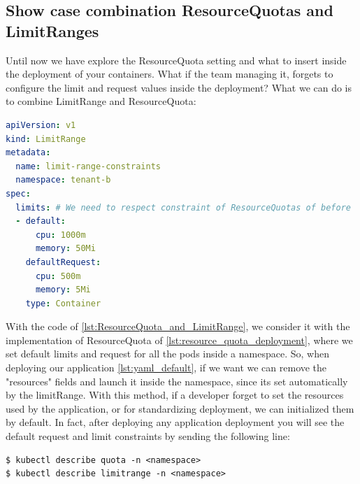 \subsection{Show case combination ResourceQuotas and LimitRanges}
Until now we have explore the ResourceQuota setting and what to insert inside the deployment of your containers. What if the team managing it, forgets to configure the limit and request values inside the deployment? What we can do is to combine LimitRange and ResourceQuota:
\begin{lstlisting}[language=yaml, caption={LimitRange setup with ResourceQuota}, label={lst:ResourceQuota_and_LimitRange}]
apiVersion: v1
kind: LimitRange
metadata:
  name: limit-range-constraints
  namespace: tenant-b
spec:
  limits: # We need to respect constraint of ResourceQuotas of before
  - default: 
      cpu: 1000m
      memory: 50Mi
    defaultRequest: 
      cpu: 500m
      memory: 5Mi
    type: Container
\end{lstlisting}
With the code of \autoref{lst:ResourceQuota_and_LimitRange}, we consider it with the implementation of ResourceQuota of \autoref{lst:resource_quota_deployment}, where we set default limits and request for all the pods inside a namespace. So, when deploying our application \autoref{lst:yaml_default}, if we want we can remove the "resources" fields and launch it inside the namespace, since its set automatically by the limitRange. With this method, if a developer forget to set the resources used by the application, or for standardizing deployment, we can initialized them by default. In fact, after deploying any application deployment you will see the default request and limit constraints by sending the following line:
\begin{lstlisting}[caption={Show constraints deployment}]
$ kubectl describe quota -n <namespace> 
$ kubectl describe limitrange -n <namespace> 
\end{lstlisting}

